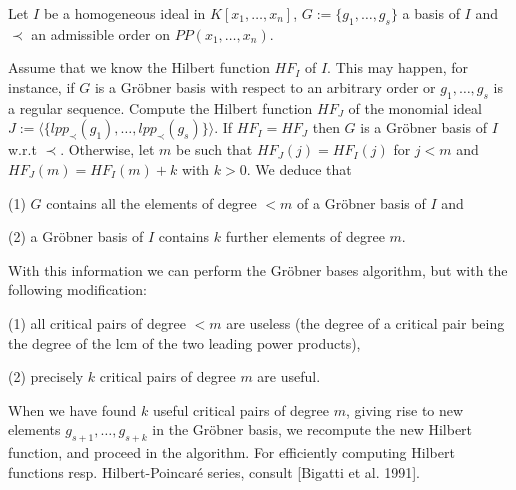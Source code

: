 Let $I$ be a homogeneous ideal in $K[x_1,\ldots,x_n]$, 
$G:=\{g_1,\dots,g_s\}$ a basis of $I$
and $\prec$ an admissible order 
on 
$PP(x_1,\ldots,x_n)$. 

\smallskip
Assume that we know the Hilbert function $HF_I$ of $I$.
This may happen, for instance, if $G$ is a Gr\"obner basis with respect to
an arbitrary order or $g_1,\dots,g_s$ is a regular sequence.
Compute the Hilbert function $HF_J$ of the monomial ideal 
$J:=\langle \{lpp_{\prec}(g_1),\dots,lpp_{\prec}(g_s)\}\rangle$.
If $HF_I=HF_J$ then $G$ is a Gr\"obner basis of $I$ w.r.t $\prec$. 
Otherwise, let $m$ be such
that $HF_J(j)=HF_I(j)$ for $j<m$ and $HF_J(m)=HF_I(m)+k$ with $k>0$. 
We deduce that

\smallskip
\noindent
(1) $G$ contains all the elements of degree $<m$ of a Gr\"obner basis of $I$ and

\noindent
(2) a Gr\"obner basis of $I$ contains $k$ further elements of degree $m$.

\smallskip
\noindent
With this information we can perform the Gr\"obner bases algorithm, but with
the following modification:

\smallskip
\noindent
(1) all critical pairs of degree $<m$ are useless (the degree of a
critical pair being the degree  of the lcm of the two
leading power products),

\noindent
(2) precisely $k$ critical pairs of degree $m$ are useful.

\smallskip
\noindent
When we have found $k$ useful critical
pairs of degree $m$, giving rise to new elements $g_{s+1},\ldots,g_{s+k}$ in
the Gr\"obner basis, we recompute the new Hilbert function, and proceed
in the algorithm. For efficiently computing Hilbert functions resp. 
Hilbert-Poincar\'e series, consult [Bigatti et al. 1991].


